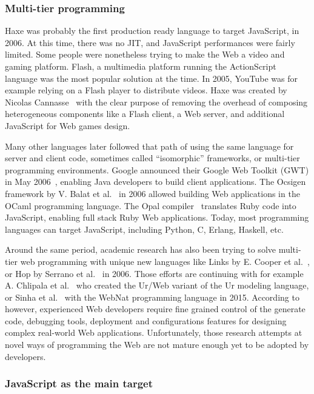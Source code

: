 \subsubsection{Multi-tier programming}%
\label{ssub:multitier}

Haxe was probably the first production ready language to target JavaScript, in 2006.
At this time, there was no JIT, and JavaScript performances were fairly limited.
Some people were nonetheless trying to make the Web a video and gaming platform.
Flash, a multimedia platform running the ActionScript language was the most popular solution at the time.
In 2005, YouTube was for example relying on a Flash player to distribute videos.
Haxe was created by Nicolas Cannasse~\cite{haxe-interview} with the clear purpose
of removing the overhead of composing heterogeneous components like a Flash client,
a Web server, and additional JavaScript for Web games design.

Many other languages later followed that path of using the same language
for server and client code, sometimes called ``isomorphic'' frameworks,
or multi-tier programming environments.
Google announced their Google Web Toolkit (GWT) in May 2006~\cite{gwt},
enabling Java developers to build client applications.
The Ocsigen framework by V. Balat et al.~\cite{balat2006ocsigen} in 2006
allowed building Web applications in the OCaml programming language.
The Opal compiler~\cite{opalrb} translates Ruby code into JavaScript,
enabling full stack Ruby Web applications.
Today, most programming languages can target JavaScript,
including Python, C, Erlang, Haskell, etc.

Around the same period, academic research has also been trying to solve
multi-tier web programming with unique new languages like Links
by E. Cooper et al.~\cite{cooper2006links},
or Hop by Serrano et al.~\cite{serrano2006hop} in 2006.
Those efforts are continuing with for example
A. Chlipala et al.~\cite{chlipala2015ur} who created the Ur/Web variant
of the Ur modeling language,
or Sinha et al.~\cite{sinha2015simplifying} with the WebNat programming language in 2015.
According to~\cite{sinha2015simplifying} however,
experienced Web developers require fine grained control of the generate code,
debugging tools, deployment and configurations features
for designing complex real-world Web applications.
Unfortunately, those research attempts at novel ways of programming the Web
are not mature enough yet to be adopted by developers.

\subsubsection{JavaScript as the main target}%
\label{ssub:javascript_as_the_main_target}

